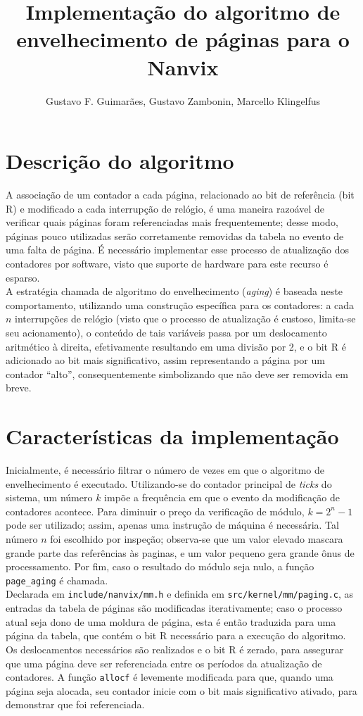 \documentclass[12pt]{sftex/sftex}
\title{Implementação do algoritmo de envelhecimento de páginas para o Nanvix}
\author{Gustavo F. Guimarães, Gustavo Zambonin, Marcello Klingelfus}
\begin{document}
\maketitle

\section{Descrição do algoritmo}

A associação de um contador a cada página, relacionado ao bit de referência
(bit R) e modificado a cada interrupção de relógio, é uma maneira razoável de
verificar quais páginas foram referenciadas mais frequentemente; desse modo,
páginas pouco utilizadas serão corretamente removidas da tabela no evento de
uma falta de página. É necessário implementar esse processo de atualização dos
contadores por software, visto que suporte de hardware para este recurso é
esparso. \\

A estratégia chamada de algoritmo do envelhecimento (\emph{aging}) é baseada
neste comportamento, utilizando uma construção específica para os contadores: a
cada $n$ interrupções de relógio (visto que o processo de atualização é
custoso, limita-se seu acionamento), o conteúdo de tais variáveis passa por um
deslocamento aritmético à direita, efetivamente resultando em uma divisão por
2, e o bit R é adicionado ao bit mais significativo, assim representando a
página por um contador ``alto'', consequentemente simbolizando que não deve ser
removida em breve.

\section{Características da implementação}

Inicialmente, é necessário filtrar o número de vezes em que o algoritmo de
envelhecimento é executado. Utilizando-se do contador principal de \emph{ticks}
do sistema, um número $k$ impõe a frequência em que o evento da modificação de
contadores acontece. Para diminuir o preço da verificação de módulo,
$k = 2^n - 1$ pode ser utilizado; assim, apenas uma instrução de máquina é
necessária. Tal número $n$ foi escolhido por inspeção; observa-se que um valor
elevado mascara grande parte das referências às paginas, e um valor pequeno
gera grande ônus de processamento. Por fim, caso o resultado do módulo seja
nulo, a função \texttt{page\_aging} é chamada. \\

Declarada em \texttt{include/nanvix/mm.h} e definida em
\texttt{src/kernel/mm/paging.c}, as entradas da tabela de páginas são
modificadas iterativamente; caso o processo atual seja dono de uma moldura de
página, esta é então traduzida para uma página da tabela, que contém o bit R
necessário para a execução do algoritmo. Os deslocamentos necessários são
realizados e o bit R é zerado, para assegurar que uma página deve ser
referenciada entre os períodos da atualização de contadores. A função
\texttt{allocf} é levemente modificada para que, quando uma página seja
alocada, seu contador inicie com o bit mais significativo ativado, para
demonstrar que foi referenciada.
\end{document}
